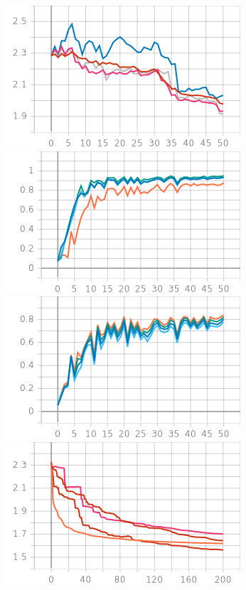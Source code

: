 \documentclass{article}
\theoremstyle{theorem}
\theoremstyle{definition}
\begin{document}
	\begin{center}
		\includegraphics[scale=0.5]{Cniid.png}
		\includegraphics[scale=0.5]{E.png}
			\includegraphics[scale=0.5]{B.png}	\includegraphics[scale=0.5]{syn.png}
	\end{center}	
\end{document}
